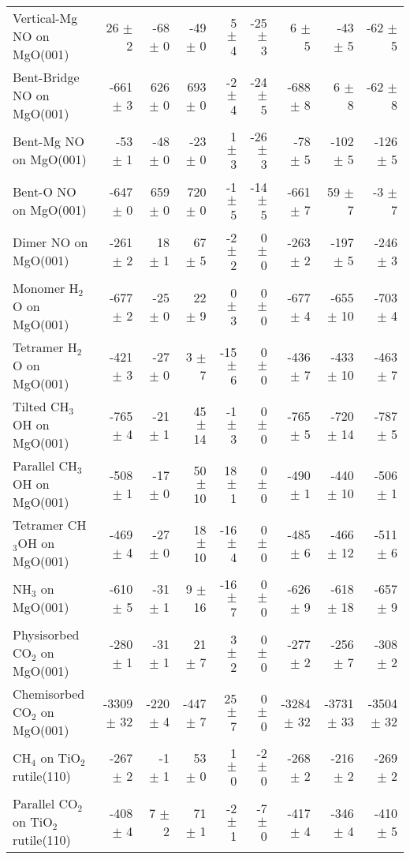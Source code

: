 \begin{table}
\begin{adjustbox}{center,max width=0.9\textwidth}
\begin{tabular}{lrrrrrrrr}
Vertical-Mg NO on MgO(001) & 26 $\pm$ 2 & -68 $\pm$ 0 & -49 $\pm$ 0 & 5 $\pm$ 4 & -25 $\pm$ 3 & 6 $\pm$ 5 & -43 $\pm$ 5 & -62 $\pm$ 5 \\
Bent-Bridge NO on MgO(001) & -661 $\pm$ 3 & 626 $\pm$ 0 & 693 $\pm$ 0 & -2 $\pm$ 4 & -24 $\pm$ 5 & -688 $\pm$ 8 & 6 $\pm$ 8 & -62 $\pm$ 8 \\
Bent-Mg NO on MgO(001) & -53 $\pm$ 1 & -48 $\pm$ 0 & -23 $\pm$ 0 & 1 $\pm$ 3 & -26 $\pm$ 3 & -78 $\pm$ 5 & -102 $\pm$ 5 & -126 $\pm$ 5 \\
Bent-O NO on MgO(001) & -647 $\pm$ 0 & 659 $\pm$ 0 & 720 $\pm$ 0 & -1 $\pm$ 5 & -14 $\pm$ 5 & -661 $\pm$ 7 & 59 $\pm$ 7 & -3 $\pm$ 7 \\
Dimer NO on MgO(001) & -261 $\pm$ 2 & 18 $\pm$ 1 & 67 $\pm$ 5 & -2 $\pm$ 2 & 0 $\pm$ 0 & -263 $\pm$ 2 & -197 $\pm$ 5 & -246 $\pm$ 3 \\
Monomer H$_2$O on MgO(001) & -677 $\pm$ 2 & -25 $\pm$ 0 & 22 $\pm$ 9 & 0 $\pm$ 3 & 0 $\pm$ 0 & -677 $\pm$ 4 & -655 $\pm$ 10 & -703 $\pm$ 4 \\
Tetramer H$_2$O on MgO(001) & -421 $\pm$ 3 & -27 $\pm$ 0 & 3 $\pm$ 7 & -15 $\pm$ 6 & 0 $\pm$ 0 & -436 $\pm$ 7 & -433 $\pm$ 10 & -463 $\pm$ 7 \\
Tilted CH$_3$OH on MgO(001) & -765 $\pm$ 4 & -21 $\pm$ 1 & 45 $\pm$ 14 & -1 $\pm$ 3 & 0 $\pm$ 0 & -765 $\pm$ 5 & -720 $\pm$ 14 & -787 $\pm$ 5 \\
Parallel CH$_3$OH on MgO(001) & -508 $\pm$ 1 & -17 $\pm$ 0 & 50 $\pm$ 10 & 18 $\pm$ 1 & 0 $\pm$ 0 & -490 $\pm$ 1 & -440 $\pm$ 10 & -506 $\pm$ 1 \\
Tetramer CH$_3$OH on MgO(001) & -469 $\pm$ 4 & -27 $\pm$ 0 & 18 $\pm$ 10 & -16 $\pm$ 4 & 0 $\pm$ 0 & -485 $\pm$ 6 & -466 $\pm$ 12 & -511 $\pm$ 6 \\
NH$_3$ on MgO(001) & -610 $\pm$ 5 & -31 $\pm$ 1 & 9 $\pm$ 16 & -16 $\pm$ 7 & 0 $\pm$ 0 & -626 $\pm$ 9 & -618 $\pm$ 18 & -657 $\pm$ 9 \\
Physisorbed CO$_2$ on MgO(001) & -280 $\pm$ 1 & -31 $\pm$ 1 & 21 $\pm$ 7 & 3 $\pm$ 2 & 0 $\pm$ 0 & -277 $\pm$ 2 & -256 $\pm$ 7 & -308 $\pm$ 2 \\
Chemisorbed CO$_2$ on MgO(001) & -3309 $\pm$ 32 & -220 $\pm$ 4 & -447 $\pm$ 7 & 25 $\pm$ 7 & 0 $\pm$ 0 & -3284 $\pm$ 32 & -3731 $\pm$ 33 & -3504 $\pm$ 32 \\
CH$_4$ on TiO$_2$ rutile(110) & -267 $\pm$ 2 & -1 $\pm$ 1 & 53 $\pm$ 0 & 1 $\pm$ 0 & -2 $\pm$ 0 & -268 $\pm$ 2 & -216 $\pm$ 2 & -269 $\pm$ 2 \\
Parallel CO$_2$ on TiO$_2$ rutile(110) & -408 $\pm$ 4 & 7 $\pm$ 2 & 71 $\pm$ 1 & -2 $\pm$ 1 & -7 $\pm$ 0 & -417 $\pm$ 4 & -346 $\pm$ 4 & -410 $\pm$ 5 \\

\end{tabular}
\end{adjustbox}
\end{table}
